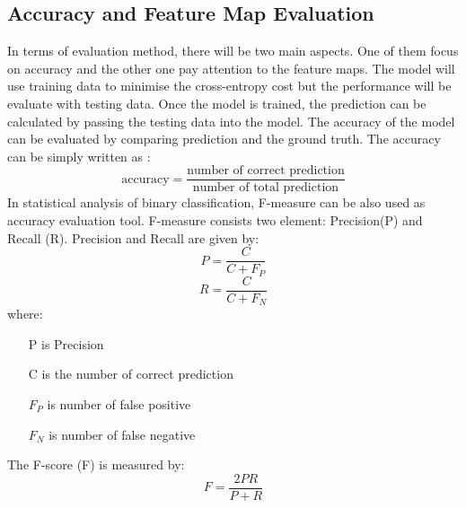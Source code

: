 \documentclass{article}
\begin{document}
\subsection{Accuracy and Feature Map Evaluation}
    In terms of evaluation method, there will be two main aspects. One of them focus on accuracy and the other one pay attention to the feature maps. The model will use training data to minimise the cross-entropy cost but the performance will be evaluate with testing data. Once the model is trained, the prediction can be calculated by passing the testing data into the model. The accuracy of the model can be evaluated by comparing prediction and the ground truth. The accuracy can be simply written as :
    \[
        \text{accuracy} = \frac{\text{number of correct prediction}}{\text{number of total prediction}}
    \]
    In statistical analysis of binary classification, F-measure can be also used as accuracy evaluation tool. F-measure consists two element: Precision(P) and Recall (R). Precision and Recall are given by:
    \[
        P = \frac{C}{C+F_P}
    \]
    \[
        R = \frac{C}{C+F_N}
    \]
    where:
    \begin{itemize}
        \item[P] is Precision
        \item[C] is the number of correct prediction
        \item[$F_P$] is number of false positive
        \item[$F_N$] is number of false negative
    \end{itemize}
    The F-score (F) is measured by:
    \[
        F = \frac{2PR}{P+R}
    \]
    
\end{document}
